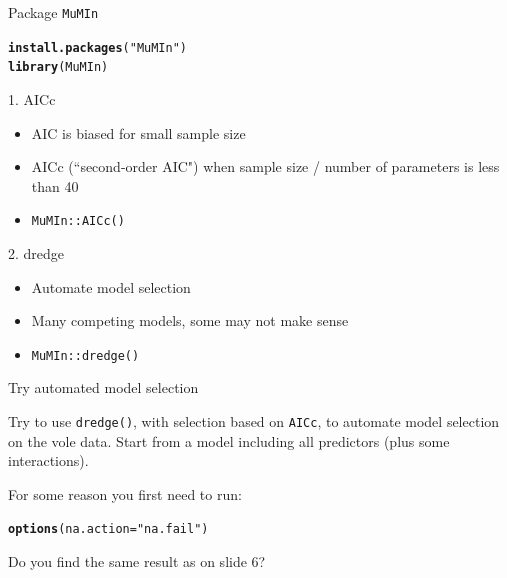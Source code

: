 \documentclass[12pt]{beamer}\usepackage[]{graphicx}\usepackage[]{color}
\makeatletter
\newcommand{\hlstr}[1]{\textcolor[rgb]{0.192,0.494,0.8}{#1}}%
\newcommand{\hlstd}[1]{\textcolor[rgb]{0.345,0.345,0.345}{#1}}%
\newcommand{\hlkwc}[1]{\textcolor[rgb]{0.333,0.667,0.333}{#1}}%
\newcommand{\hlkwd}[1]{\textcolor[rgb]{0.737,0.353,0.396}{\textbf{#1}}}%
\newenvironment{kframe}{%
 \def\at@end@of@kframe{}%
 \ifinner\ifhmode%
  \def\at@end@of@kframe{\end{minipage}}%
  \begin{minipage}{\columnwidth}%
 \fi\fi%
 \def\FrameCommand##1{\hskip\@totalleftmargin \hskip-\fboxsep
 \colorbox{shadecolor}{##1}\hskip-\fboxsep
     \hskip-\linewidth \hskip-\@totalleftmargin \hskip\columnwidth}%
 \MakeFramed {\advance\hsize-\width
   \@totalleftmargin\z@ \linewidth\hsize
   \@setminipage}}%
 {\par\unskip\endMakeFramed%
 \at@end@of@kframe}
\newenvironment{knitrout}{}{} %
\makeatother
\begin{document}
\begin{frame}{Package \texttt{MuMIn}}
 
\begin{knitrout}\small
{}\color{fgcolor}\begin{kframe}
\begin{alltt}
\hlkwd{install.packages}\hlstd{(}\hlstr{"MuMIn"}\hlstd{)}
\hlkwd{library}\hlstd{(MuMIn)}
\end{alltt}
\end{kframe}
\end{knitrout}

\pause

\begin{exampleblock}{1. AICc}
  \begin{itemize}
    \item AIC is biased for small sample size
    \item AICc (``second-order AIC") when sample size / number of parameters is less than 40
    \item \texttt{MuMIn::AICc()}
  \end{itemize}
\end{exampleblock}

\pause

\begin{alertblock}{2. dredge}
  \begin{itemize}
    \item Automate model selection
    \item Many competing models, some may not make sense
    \item \texttt{MuMIn::dredge()}
  \end{itemize}
\end{alertblock}

\end{frame}

\begin{frame}{Try automated model selection}

Try to use \texttt{dredge()}, with selection based on \texttt{AICc}, to automate model selection on the vole data. Start from a model including all predictors (plus some interactions).

For some reason you first need to run:
\begin{knitrout}\small
{}\color{fgcolor}\begin{kframe}
\begin{alltt}
\hlkwd{options}\hlstd{(}\hlkwc{na.action}\hlstd{=}\hlstr{"na.fail"}\hlstd{)}
\end{alltt}
\end{kframe}
\end{knitrout}


Do you find the same result as on slide 6?

\end{frame}
\end{document}
